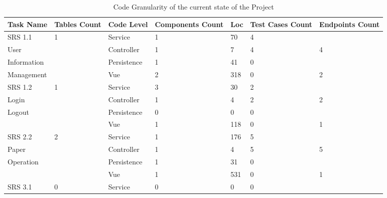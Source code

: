 \documentclass[conference]{IEEEtran}
\begin{document}
\begin{table}[!htb]
	\renewcommand{\arraystretch}{1.3}
	\caption{Code Granularity of the current state of the Project}
	\centering
	\begin{tabular}{p{2cm}p{1.5cm}p{2cm}p{3cm}p{1.5cm}p{3cm}l}
		\hline
		Task Name   & Tables Count & Code Level                  & Components Count & Loc & Test Cases Count & Endpoints Count \\
		\hline
		SRS 1.1     & 1            & Service                     & 1                & 70  & 4                &                 \\
		User        &              & Controller                  & 1                & 7   & 4                & 4               \\
		Information &              & Persistence\footnotemark[7] & 1                & 41  & 0                &                 \\
		Management  &              & Vue \footnotemark[8]        & 2                & 318 & 0                & 2               \\
		\hline
		SRS 1.2     & 1            & Service                     & 3                & 30  & 2                &                 \\
		Login       &              & Controller                  & 1                & 4   & 2                & 2               \\
		Logout      &              & Persistence                 & 0                & 0   & 0                &                 \\
		            &              & Vue                         & 1                & 118 & 0                & 1               \\
		\hline
		SRS 2.2     & 2            & Service                     & 1                & 176 & 5                &                 \\
		Paper       &              & Controller                  & 1                & 4   & 5                & 5               \\
		Operation   &              & Persistence                 & 1                & 31  & 0                &                 \\
		            &              & Vue                         & 1                & 531 & 0                & 1               \\
		\hline
		SRS 3.1     & 0            & Service                     & 0                & 0   & 0                &                 \\

\end{tabular}
\end{table}
\end{document}
